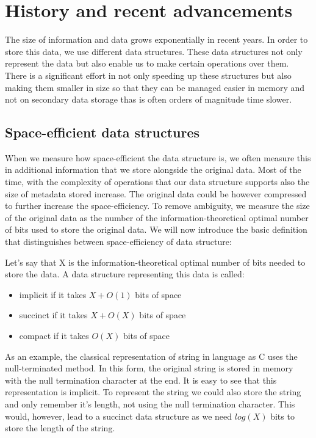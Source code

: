 \chapter{History and recent advancements}
\label{kap:kap1}

The size of information and data grows exponentially in recent years. In order to store this data, we use different data structures. These data structures not only represent the data but also enable us to make certain operations over them. There is a significant effort in not only speeding up these structures but also making them smaller in size so that they can be managed easier in memory and not on secondary data storage thas is often orders of magnitude time slower.

\section{Space-efficient data structures}

When we measure how space-efficient the data structure is, we often measure this in additional information that we store alongside the original data. Most of the time, with the complexity of operations that our data structure supports also the size of metadata stored increase. The original data could be however compressed to further increase the space-efficiency. To remove ambiguity, we measure the size of the original data as the number of the information-theoretical optimal number of bits used to store the original data. We will now introduce the basic definition that distinguishes between space-efficiency of data structure:

Let's say that X is the information-theoretical optimal number of bits needed to store the data. A data structure representing this data is called:
\begin{itemize}
\item implicit if it takes $X + O(1)$ bits of space
\item succinct if it takes $X + O(X)$ bits of space
\item compact if it takes $O(X)$ bits of space
\end{itemize}

As an example, the classical representation of string in language as C uses the null-terminated method. In this form, the original string is stored in memory with the null termination character at the end. It is easy to see that this representation is implicit. To represent the string we could also store the string and only remember it's length, not using the null termination character. This would, however, lead to a succinct data structure as we need $log(X)$ bits to store the length of the string.

